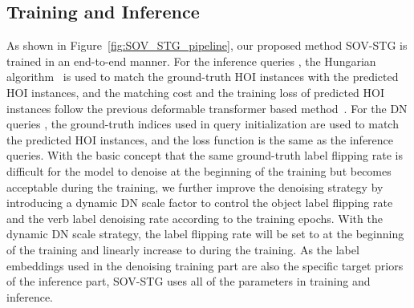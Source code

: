 \documentclass[10pt,twocolumn,letterpaper]{article}
\begin{document}
\subsection{Training and Inference}
\label{sec:training_inference}
As shown in Figure~\ref{fig:SOV_STG_pipeline}, our proposed method SOV-STG is trained in an end-to-end manner.
For the inference queries , the Hungarian algorithm~\cite{kuhn1955hungarian} is used to match the ground-truth HOI instances with the predicted HOI instances, and the matching cost and the training loss of predicted HOI instances follow the previous deformable transformer based method~\cite{cjw_qahoi}.
For the DN queries , the ground-truth indices used in query initialization are used to match the predicted HOI instances, and the loss function is the same as the inference queries.
With the basic concept that the same ground-truth label flipping rate is difficult for the model to denoise at the beginning of the training but becomes acceptable during the training, we further improve the denoising strategy by introducing a dynamic DN scale factor  to control the object label flipping rate  and the verb label denoising rate  according to the training epochs.
With the dynamic DN scale strategy, the label flipping rate  will be set to  at the beginning of the training and linearly increase to  during the training.
As the label embeddings used in the denoising training part are also the specific target priors of the inference part, SOV-STG uses all of the parameters in training and inference.
\end{document}
